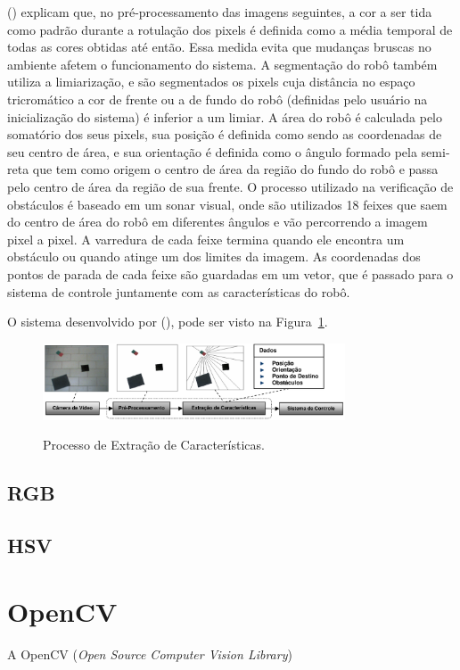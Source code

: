 \citeauthor{andrade2006sistema} (\citeyear{andrade2006sistema}) explicam que, no pré-processamento das imagens seguintes, a cor a ser tida como padrão durante a rotulação dos pixels é definida como a média temporal de todas as cores obtidas até então. Essa medida evita que mudanças bruscas no ambiente afetem o funcionamento do sistema. A segmentação do robô também utiliza a limiarização, e são segmentados os pixels cuja distância no espaço tricromático a cor de frente ou a de fundo do robô (definidas pelo usuário na inicialização do sistema) é inferior a um limiar. A área do robô é calculada pelo somatório dos seus pixels, sua posição é definida como sendo as coordenadas de seu centro de área, e sua orientação é definida como o ângulo formado pela semi-reta que tem como origem o centro de área da região do fundo do robô e passa pelo centro de área da região de sua frente. O processo utilizado na verificação de obstáculos é baseado em um sonar visual, onde são utilizados 18 feixes que saem do centro de área do robô em diferentes ângulos e vão percorrendo a imagem pixel a pixel. A varredura de cada feixe termina quando ele encontra um obstáculo ou quando atinge um dos limites da imagem. As coordenadas dos pontos de parada de cada feixe são guardadas em um vetor, que é passado para o sistema de controle juntamente com as características do robô.

O sistema desenvolvido por \citeauthor{andrade2006sistema} (\citeyear{andrade2006sistema}), pode ser visto na Figura~\ref{fig:triangulacao}.

\begin{figure}[!hbtp]
  \centering
   \caption{Processo de Extração de Características.}
    \includegraphics[width = 0.8\textwidth]{Caps/Figs/ref-teorico/triangulacao.png}
   \label{fig:triangulacao}
\end{figure}


\subsection{RGB}
\label{subsec:rgb}

\subsection{HSV}
\label{subsec:hsv}


\section{OpenCV}
\label{sec:opencv}

A OpenCV (\textit{Open Source Computer Vision Library})


 
